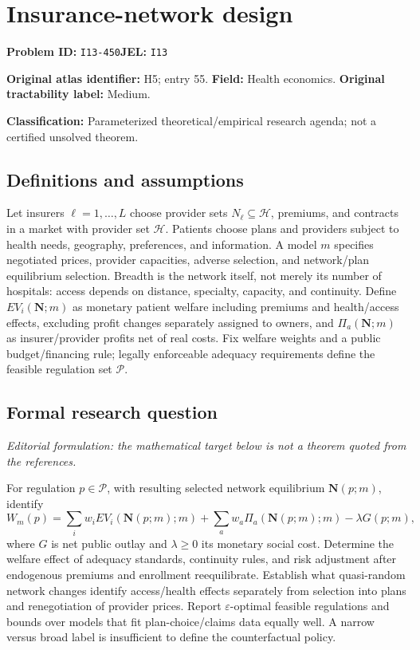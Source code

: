 \documentclass[11pt,a4paper]{article}
\begin{document}
\section*{Insurance-network design}
\textbf{Problem ID:} \texttt{I13-450}\quad \textbf{JEL:} \texttt{I13}\par
\label{problem:OP-0055}
\label{atlas:prob:H5}
\noindent\textbf{Original atlas identifier:} H5; entry 55. \textbf{Field:} Health economics. \textbf{Original tractability label:} Medium.

\noindent\textbf{Classification:} Parameterized theoretical/empirical research agenda; not a certified unsolved theorem.

\subsection*{Definitions and assumptions}
Let insurers $\ell=1,\ldots,L$ choose provider sets $N_\ell\subseteq\mathcal H$, premiums, and contracts in a market with provider set $\mathcal H$. Patients choose plans and providers subject to health needs, geography, preferences, and information. A model $m$ specifies negotiated prices, provider capacities, adverse selection, and network/plan equilibrium selection. Breadth is the network itself, not merely its number of hospitals: access depends on distance, specialty, capacity, and continuity. Define $EV_i(\mathbf N;m)$ as monetary patient welfare including premiums and health/access effects, excluding profit changes separately assigned to owners, and $\Pi_a(\mathbf N;m)$ as insurer/provider profits net of real costs. Fix welfare weights and a public budget/financing rule; legally enforceable adequacy requirements define the feasible regulation set $\mathcal P$.

\subsection*{Formal research question}
\emph{Editorial formulation: the mathematical target below is not a theorem quoted from the references.}

For regulation $p\in\mathcal P$, with resulting selected network equilibrium $\mathbf N(p;m)$, identify
\[
 W_m(p)=\sum_iw_iEV_i(\mathbf N(p;m);m)+\sum_aw_a\Pi_a(\mathbf N(p;m);m)-\lambda G(p;m),
\]
where $G$ is net public outlay and $\lambda\geq0$ its monetary social cost. Determine the welfare effect of adequacy standards, continuity rules, and risk adjustment after endogenous premiums and enrollment reequilibrate. Establish what quasi-random network changes identify access/health effects separately from selection into plans and renegotiation of provider prices. Report $\varepsilon$-optimal feasible regulations and bounds over models that fit plan-choice/claims data equally well. A narrow versus broad label is insufficient to define the counterfactual policy.
\end{document}
